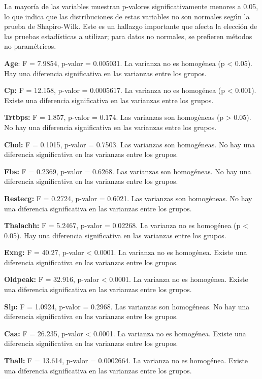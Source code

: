 \documentclass[
]{article}
\begin{document}
La mayoría de las variables muestran p-valores significativamente
menores a 0.05, lo que indica que las distribuciones de estas variables
no son normales según la prueba de Shapiro-Wilk. Este es un hallazgo
importante que afecta la elección de las pruebas estadísticas a
utilizar; para datos no normales, se prefieren métodos no paramétricos.

\textbf{Age}: F = 7.9854, p-valor = 0.005031. La varianza no es
homogénea (p \textless{} 0.05). Hay una diferencia significativa en las
varianzas entre los grupos.

\textbf{Cp:} F = 12.158, p-valor = 0.0005617. La varianza no es
homogénea (p \textless{} 0.001). Existe una diferencia significativa en
las varianzas entre los grupos.

\textbf{Trtbps:} F = 1.857, p-valor = 0.174. Las varianzas son
homogéneas (p \textgreater{} 0.05). No hay una diferencia significativa
en las varianzas entre los grupos.

\textbf{Chol:} F = 0.1015, p-valor = 0.7503. Las varianzas son
homogéneas. No hay una diferencia significativa en las varianzas entre
los grupos.

\textbf{Fbs:} F = 0.2369, p-valor = 0.6268. Las varianzas son
homogéneas. No hay una diferencia significativa en las varianzas entre
los grupos.

\textbf{Restecg:} F = 0.2724, p-valor = 0.6021. Las varianzas son
homogéneas. No hay una diferencia significativa en las varianzas entre
los grupos.

\textbf{Thalachh:} F = 5.2467, p-valor = 0.02268. La varianza no es
homogénea (p \textless{} 0.05). Hay una diferencia significativa en las
varianzas entre los grupos.

\textbf{Exng:} F = 40.27, p-valor \textless{} 0.0001. La varianza no es
homogénea. Existe una diferencia significativa en las varianzas entre
los grupos.

\textbf{Oldpeak:} F = 32.916, p-valor \textless{} 0.0001. La varianza no
es homogénea. Existe una diferencia significativa en las varianzas entre
los grupos.

\textbf{Slp:} F = 1.0924, p-valor = 0.2968. Las varianzas son
homogéneas. No hay una diferencia significativa en las varianzas entre
los grupos.

\textbf{Caa:} F = 26.235, p-valor \textless{} 0.0001. La varianza no es
homogénea. Existe una diferencia significativa en las varianzas entre
los grupos.

\textbf{Thall:} F = 13.614, p-valor = 0.0002664. La varianza no es
homogénea. Existe una diferencia significativa en las varianzas entre
los grupos.
\end{document}
